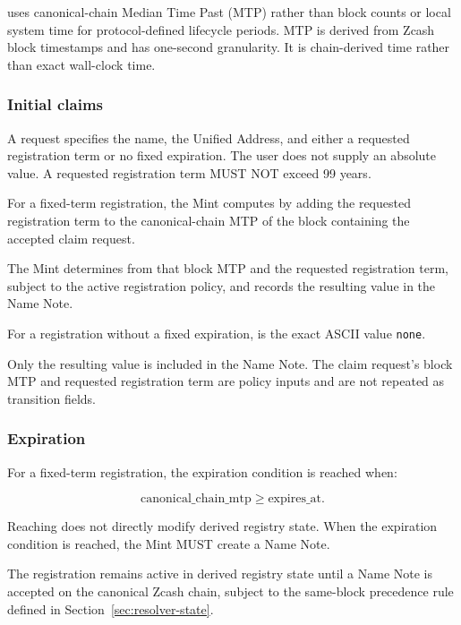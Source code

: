 \zns{} uses canonical-chain Median Time Past (MTP) rather than block counts or local system time for protocol-defined lifecycle periods. MTP is derived from Zcash block timestamps and has one-second granularity. It is chain-derived time rather than exact wall-clock time.

\subsubsection{Initial claims}

A  request specifies the name, the Unified Address, and either a requested registration term or no fixed expiration. The user does not supply an absolute  value. A requested registration term MUST NOT exceed 99 years.

For a fixed-term registration, the Mint computes  by adding the requested registration term to the canonical-chain MTP of the block containing the accepted claim request.

The Mint determines  from that block MTP and the requested registration term, subject to the active registration policy, and records the resulting value in the Name Note.

For a registration without a fixed expiration,  is the exact ASCII value \texttt{none}.

Only the resulting  value is included in the Name Note. The claim request's block MTP and requested registration term are policy inputs and are not repeated as transition fields.

\subsubsection{Expiration}

For a fixed-term registration, the expiration condition is reached when:

$$\text{canonical\_chain\_mtp} \geq \text{expires\_at}.$$

Reaching  does not directly modify derived registry state. When the expiration condition is reached, the Mint MUST create a  Name Note.

The registration remains active in derived registry state until a  Name Note is accepted on the canonical Zcash chain, subject to the same-block precedence rule defined in Section~\ref{sec:resolver-state}.

